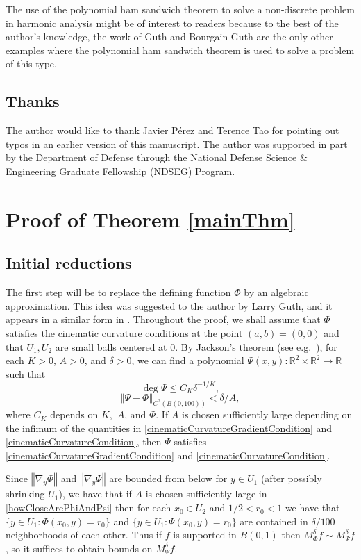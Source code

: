 \documentclass[reqno]{amsart}
\theoremstyle{definition}
\theoremstyle{remark}
\theoremstyle{remark}
\newcommand{\norm}[1]{\left\Vert#1\right\Vert}
\newcommand{\RR}{\mathbb{R}}
\begin{document}
The use of the polynomial ham sandwich theorem to solve a non-discrete problem in harmonic analysis might be of interest to readers because to the best of the author's knowledge, the work of Guth \cite{Guth} and Bourgain-Guth \cite{Bourgain} are the only other examples where the polynomial ham sandwich theorem is used to solve a problem of this type.

\subsection{Thanks}
The author would like to thank Javier P\'erez and Terence Tao for pointing out typos in an earlier version of this manuscript. The author was supported in part by the Department of Defense through the National Defense Science \& Engineering Graduate Fellowship (NDSEG) Program.

\section{Proof of Theorem \ref{mainThm}}
\subsection{Initial reductions}
The first step will be to replace the defining function $\Phi$ by an algebraic approximation. This idea was suggested to the author by Larry Guth, and it appears in a similar form in \cite{Bourgain}. Throughout the proof, we shall assume that $\Phi$ satisfies the cinematic curvature conditions at the point $(a,b)=(0,0)$ and that $U_1,U_2$ are small balls centered at 0. By Jackson's theorem (see e.g.~\cite{Bagby}), for each $K>0$, $A>0$, and $\delta>0$, we can find a polynomial $\Psi(x,y)\colon\RR^2\times\RR^2\to\RR$ such that
\begin{equation}\label{degreeOfPsi}
\deg\Psi\leq C_K \delta^{-1/K},
\end{equation}
\begin{equation}\label{howCloseArePhiAndPsi}
\norm{\Psi-\Phi}_{C^2(B(0,100))}<\delta/A,
\end{equation}
where $C_K$ depends on $K,$ $A$, and $\Phi$. If $A$ is chosen sufficiently large depending on the infimum of the quantities in \eqref{cinematicCurvatureGradientCondition} and \eqref{cinematicCurvatureCondition},
then $\Psi$ satisfies \eqref{cinematicCurvatureGradientCondition} and \eqref{cinematicCurvatureCondition}.

Since $\norm{\nabla_y\Phi}$ and $\norm{\nabla_y\Psi}$ are bounded from below for $y\in U_1$ (after possibly shrinking $U_1$), we have that if $A$ is chosen sufficiently large in \eqref{howCloseArePhiAndPsi} then for each $x_0\in U_2$ and $1/2 < r_0 <1$ we have that $\{y\in U_1\colon \Phi(x_0,y)=r_0\}$ and $\{y\in U_1\colon \Psi(x_0,y)=r_0\}$ are contained in $\delta/100$ neighborhoods of each other. Thus if $f$ is supported in $B(0,1)$ then $M_\Phi^\delta f \sim M_\Psi^\delta f$, so it suffices to obtain bounds on $M_\Psi^\delta f.$
\end{document}
